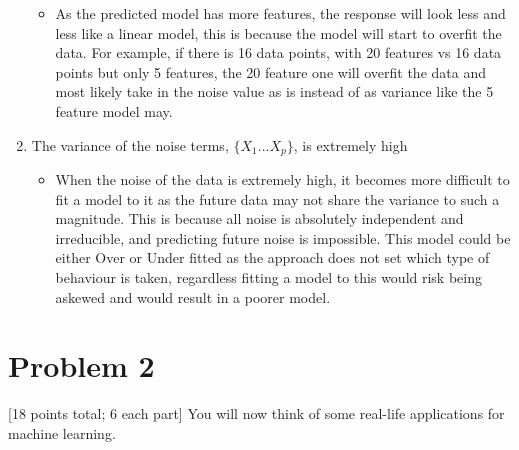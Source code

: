 \documentclass[11pt]{article}
\begin{document}
\begin{enumerate}[label=(\alph*)]
          \begin{itemize}
              \item As the predicted model has more features, the response will look less and less like a linear model, this is because the model will start to overfit the data. For example, if there is 16 data points, with 20 features vs 16 data points but only 5 features, the 20 feature one will overfit the data and most likely take in the noise value as is instead of as variance like the 5 feature model may.
          \end{itemize}
    \item The variance of the noise terms, $\{X_1 ... X_p\}$, is extremely high
          \begin{itemize}
              \item When the noise of the data is extremely high, it becomes more difficult to fit a model to it as the future data may not share the variance to such a magnitude. This is because all noise is absolutely independent and irreducible, and predicting future noise is impossible. This model could be either Over or Under fitted as the approach does not set which type of behaviour is taken, regardless fitting a model to this would risk being askewed and would result in a poorer model.
          \end{itemize}
\end{enumerate}

\pagebreak
\section{Problem 2}
 [18 points total; 6 each part] You will now think of some real-life applications for machine learning. \\
\end{document}
